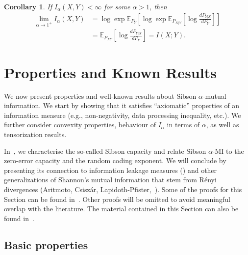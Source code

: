 \documentclass{article}
\numberwithin{theorem}{section}
\newtheorem{corollary}[theorem]{Corollary}
\numberwithin{example}{section}
\numberwithin{remark}{section}
\numberwithin{definition}{section}
\newcommand{\E}{\mathbb{E}}
\begin{document}
\begin{corollary}
    If $I_\alpha(X,Y) < \infty$ for some $\alpha >1$, then
\begin{align}
    \lim_{\alpha \to 1^+} I_\alpha (X,Y) \nonumber &= \log \exp \E_{P_Y} \left[ \log \exp \E_{P_{X|Y}} \left[ \log \frac{dP_{Y|X}}{dP_Y}  \right]       \right]  \nonumber  \\ &= \E_{P_{XY}} \left[ \log \frac{dP_{Y|X}}{dP_Y} \right] = I(X;Y).
\end{align}
\end{corollary}


\section{Properties and Known Results}\label{sec:propertiesknownresults}

We now present properties and well-known results about Sibson $\alpha$-mutual information. We start by showing that it satisfies ``axiomatic'' properties of an information measure (e.g., non-negativity, data processing inequality, etc.).  We further consider convexity properties, behaviour of $I_\alpha$ in terms of $\alpha$, as well as tensorization results.




In~, we characterise the so-called Sibson capacity and relate Sibson $\alpha$-MI to the zero-error capacity and the random coding exponent. We will conclude by presenting its connection to information leakage measures () and other generalizations of Shannon's mutual information that stem from R\'enyi divergences (Aritmoto, Csisz\'ar, Lapidoth-Pfister,~). Some of the proofs for this Section can be found in~. Other proofs will be omitted to avoid meaningful overlap with the literature. The material contained in this Section can also be found in~\cite{csiszar:95,Sibson:69,verdu:2015,KurriSK:22,MaximalLeakage:20,shannon:56,SiuWaiV:15,LapidothP:18,aishwarya:19,wuWIS:20}.

\subsection{Basic properties}\label{sec:basicProperties}
\end{document}
